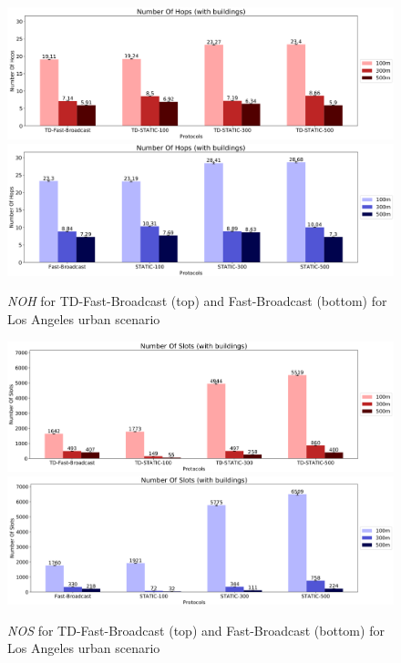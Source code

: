 		\begin{figure}[H]
			\centering
			\includegraphics[width=1.0\textwidth]{immagini/td-fb-la/td-fb/noh}	
			\includegraphics[width=1.0\textwidth]{immagini/td-fb-la/fb/noh}
			\caption{\textit{NOH} for TD-Fast-Broadcast (top) and Fast-Broadcast (bottom) for Los Angeles urban scenario}
			\label{fig:la-td-noh}
		\end{figure}
					
		\begin{figure}[H]
			\centering
			\includegraphics[width=1.0\textwidth]{immagini/td-fb-la/td-fb/nos}	
			\includegraphics[width=1.0\textwidth]{immagini/td-fb-la/fb/nos}
			\caption{\textit{NOS} for TD-Fast-Broadcast (top) and Fast-Broadcast (bottom) for Los Angeles urban scenario}
			\label{fig:la-td-nos}
		\end{figure}
						
